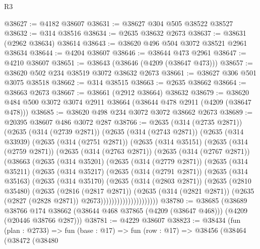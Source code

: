 \begin{lexlean}{R3}
\begin{coremodule}
@38627 := @4182 @38607
@38631 := @38627 @304 @505 @38522 @38527
@38632 := @314 @38516
@38634 := @2635 @38632 @2673
@38637 := @38631 (@2962 @38634) @38614
@38643 := @38620 @496 @504 @3072 @38521 @2961 @38634
@38644 := @4204 @38607
@38646 := @38644 @473 @2961
@38647 := @4210 @38607
@38651 := @38643 (@38646 (@4209 (@38647 @473)))
@38657 := @38620 @502 @234 @38519 @3072 @38632 @2673
@38661 := @38627 @306 @501 @3075 @38518
@38662 := @314 @38515
@38663 := @2635 @38662
@38664 := @38663 @2673
@38667 := @38661 (@2912 @38664) @38632
@38679 := @38620 @484 @500 @3072 @3074 @2911 @38664 (@38644 @478 @2911 (@4209 (@38647 @478)))
@38685 := @38620 @498 @234 @3072 @3072 @38662 @2673
@38689 := @20395 @38607 @486 @3072 @287
@38766 := @2635
    (@314 (@2735 @2871))
    (@2635
      (@314 (@2739 @2871))
      (@2635
        (@314 (@2743 @2871))
        (@2635
          (@314 @33939)
          (@2635
            (@314 (@2751 @2871))
            (@2635
              (@314 @35151)
              (@2635
                (@314 (@2759 @2871))
                (@2635
                  (@314 (@2763 @2871))
                  (@2635
                    (@314 (@2767 @2871))
                    (@38663
                      (@2635
                        (@314 @35201)
                        (@2635
                          (@314 (@2779 @2871))
                          (@2635
                            (@314 @35211)
                            (@2635
                              (@314 @35217)
                              (@2635
                                (@314 (@2791 @2871))
                                (@2635
                                  (@314 @35163)
                                  (@2635
                                    (@314 @35170)
                                    (@2635
                                      (@314 (@2803 @2871))
                                      (@2635
                                        (@2810 @35480)
                                        (@2635
                                          (@2816 (@2817 @2871))
                                          (@2635
                                            (@314 (@2821 @2871))
                                            (@2635 (@2827 (@2828 @2871)) @2673)))))))))))))))))))))
@38780 := @38685
    (@38689
      @38766
      @174
      @38662
      (@38644 @468 @37865 (@4209 (@38647 @468)))
      (@4209 (@20446 @38766 @287)))
@38781 := @4229 @38607
@38823 := @38434
    (fun (plan : @2733) =>
    fun (base : @17) =>
    fun (row : @17) =>
    @38456
      (@38464
        (@38472
          (@38480

\end{coremodule}
\end{lexlean}
